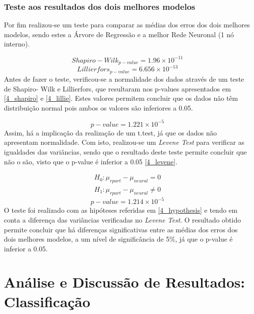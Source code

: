 \documentclass[conference]{IEEEtran}
\begin{document}
\subsubsection{Teste aos resultados dos dois melhores modelos}
Por fim realizou-se um teste para comparar as médias dos erros dos dois melhores modelos, sendo estes a Árvore de Regressão e a melhor Rede Neuronal (1 nó interno).

\begin{equation}
Shapiro-Wilk_{p-value}=1.96\times 10^{-11}\label{4_shapiro}
\end{equation}
\begin{equation}
Lillierfors_{p-value}=6.656\times 10^{-13}\label{4_lillie}
\end{equation}
Antes de fazer o teste, verificou-se a normalidade dos dados através de um teste de Shapiro- Wilk e Lillierfors, que resultaram nos p-values apresentados em \eqref{4_shapiro} e \eqref{4_lillie}. Estes valores permitem concluir que os dados não têm distribuição normal pois ambos os valores são inferiores a 0.05.

\begin{equation}
p-value=1.221\times 10^{-5}\label{4_levene}
\end{equation}
Assim, há a implicação da realização de um t.test, já que os dados não apresentam normalidade. Com isto, realizou-se um \textit{Levene Test} para verificar as igualdades das variâncias, sendo que o resultado deste teste permite concluir que não o são, visto que o p-value é inferior a 0.05 \eqref{4_levene}.

\begin{equation}
  \begin{array}{l}
    H_{0}:\mu _{rpart} - \mu _{neural}=0 \\ 
    H_{1}:\mu _{rpart} - \mu _{neural}\neq 0
  \end{array}\label{4_hypothesis}
\end{equation}
\begin{equation}
p-value=1.214\times 10^{-5}\label{4_ttest}
\end{equation}
O teste foi realizado com as hipóteses referidas em \eqref{4_hypothesis} e tendo em conta a diferença das variâncias verificadas no \textit{Levene Test}. O resultado obtido permite concluir que há diferenças significativas entre as médias dos erros dos dois melhores modelos, a um nível de significância de 5\%, já que o p-value é inferior a 0.05.



\section{Análise e Discussão de Resultados: Classificação} 
\label{classification} %
\end{document}
